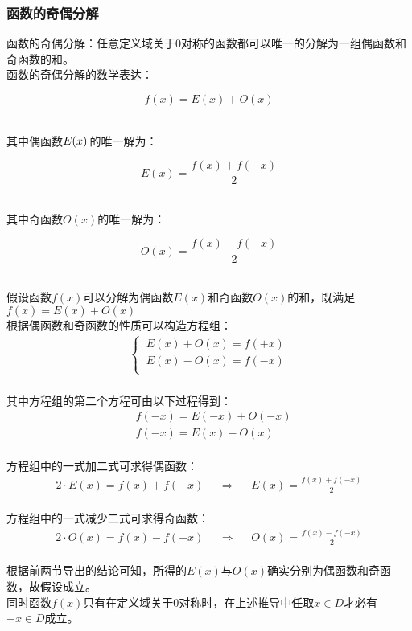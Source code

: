 \documentclass[UTF8]{ctexart}
\begin{document}
\subsubsection{函数的奇偶分解}
    \setcounter{equation}{0}
    函数的奇偶分解：任意定义域关于$0$对称的函数都可以唯一的分解为一组偶函数和奇函数的和。\\[3mm]
    函数的奇偶分解的数学表达：
    \begin{large}
        \begin{equation*}
            f(x)=E(x)+O(x)
        \end{equation*}
    \end{large}\\
    其中偶函数$E(x)\hspace{1.5pt}$的唯一解为：
    \begin{large}
        \begin{equation*}
            E(x)=\frac{f(x)+f(-x)}{2}
        \end{equation*}
    \end{large}\\
    其中奇函数$O(x)$的唯一解为：
    \begin{large}
        \begin{equation*}
            O(x)=\frac{f(x)-f(-x)}{2}
        \end{equation*}
    \end{large}\\
    假设函数$f(x)$可以分解为偶函数$E(x)$和奇函数$O(x)$的和，既满足$f(x)=E(x)+O(x)$\\[3mm]
    根据偶函数和奇函数的性质可以构造方程组：
    \begin{align}
        \begin{cases}
            ~E(x)+O(x)=f(+x)\\[1mm]
            ~E(x)-O(x)=f(-x)\\
        \end{cases}
    \end{align}\\
    其中方程组的第二个方程可由以下过程得到：
    \begin{align}
        &f(-x)=E(-x)+O(-x)\\[5mm]
        &f(-x)=E(x)-O(x)
    \end{align}\\
    方程组中的一式加二式可求得偶函数：
    \begin{align}
        2\cdot E(x)=f(x)+f(-x)~~~~~~\Longrightarrow~~~~~~E(x)=\frac{f(x)+f(-x)}{2}
    \end{align}\\
    方程组中的一式减少二式可求得奇函数：
    \begin{align}
        2\cdot O(x)=f(x)-f(-x)~~~~~~\Longrightarrow~~~~~~O(x)=\frac{f(x)-f(-x)}{2}
    \end{align}\\
    根据前两节导出的结论可知，所得的$E(x)$与$O(x)$确实分别为偶函数和奇函数，故假设成立。\\[3mm]
    同时函数$f(x)$只有在定义域关于$0$对称时，在上述推导中任取$x\in D$才必有$-x\in D$成立。
\end{document}
